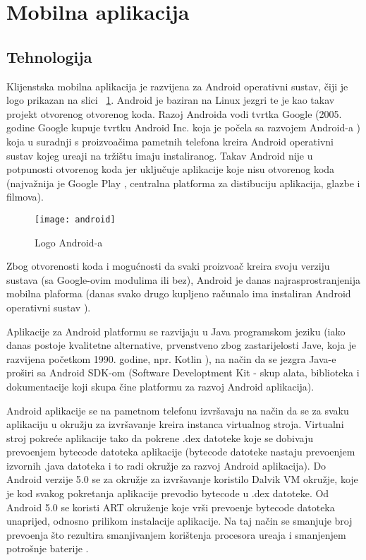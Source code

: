 \section{Mobilna aplikacija}

\subsection{Tehnologija}
Klijenstska mobilna aplikacija je razvijena za Android operativni sustav, \v{c}iji je logo prikazan na slici ~\ref{fig:android}. Android je baziran na Linux jezgri te je kao takav projekt otvorenog otvorenog koda. Razoj Androida vodi tvrtka Google (2005. godine Google kupuje tvrtku Android Inc. koja je po\v{c}ela sa razvojem Android-a \cite{kupnjaAndroida}) koja u suradnji s proizvo\dj a\v{c}ima pametnih telefona kreira Android operativni sustav kojeg ure\dj aji na tr\v{z}i\v{s}tu imaju instaliranog. Takav Android nije u potpunosti otvorenog koda jer uklju\v{c}uje aplikacije koje nisu otvorenog koda (najva\v{z}nija je Google Play \cite{googlePlay}, centralna platforma za distibuciju aplikacija, glazbe i filmova).

\begin{figure}[!htbp]
	\begin{center}
 \texttt{[image: android]}
 \caption{Logo Android-a}
 \label{fig:android}
	\end{center}
\end{figure}

Zbog otvorenosti koda i mogu\'{c}nosti da svaki proizvo\dj a\v{c} kreira svoju verziju sustava (sa Google-ovim modulima ili bez), Android je danas najrasprostranjenija mobilna plaforma (danas svako drugo kupljeno ra\v{c}unalo ima instaliran Android operativni sustav \cite{androidDominacija}).

Aplikacije za Android platformu se razvijaju u Java programskom jeziku (iako danas postoje kvalitetne alternative, prvenstveno zbog zastarijelosti Jave, koja je razvijena po\v{c}etkom 1990. godine, npr. Kotlin \cite{kotlin}), na na\v{c}in da se jezgra Java-e pro\v{s}iri sa Android SDK-om (Software Developtment Kit - skup alata, biblioteka i dokumentacije koji skupa \v{c}ine platformu za razvoj Android aplikacija). 

Android aplikacije se na pametnom telefonu izvr\v{s}avaju na na\v{c}in da se za svaku aplikaciju u okru\v{z}ju za izvr\v{s}avanje kreira instanca virtualnog stroja. 
Virtualni stroj pokre\'{c}e aplikacije tako da pokrene .dex datoteke koje se dobivaju prevo\dj enjem bytecode datoteka aplikacije (bytecode datoteke nastaju prevo\dj enjem izvornih .java datoteka i to radi okru\v{z}je za razvoj Android aplikacija). Do Android verzije 5.0 se za okru\v{z}je za izvr\v{s}avanje koristilo Dalvik VM okru\v{z}je, koje je kod svakog pokretanja aplikacije prevodio bytecode u .dex datoteke. Od Android 5.0 se koristi ART okru\v{z}enje koje vr\v{s}i prevo\dj enje bytecode datoteka unaprijed, odnosno prilikom instalacije aplikacije. Na taj na\v{c}in se smanjuje broj prevo\dj enja \v{s}to rezultira smanjivanjem kori\v{s}tenja procesora ure\dj aja i smanjenjem potro\v{s}nje baterije \cite{dalvikArt}.



